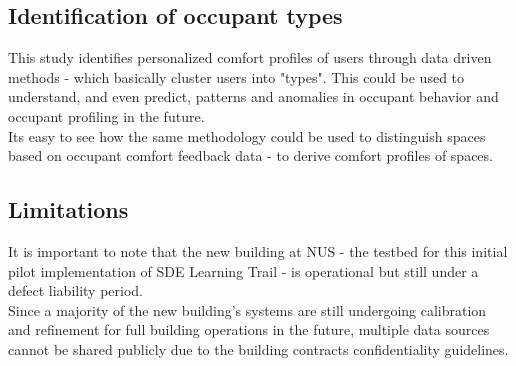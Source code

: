 \subsection{Identification of occupant types}

This study identifies personalized comfort profiles of users through data driven methods - which basically cluster users into "types". This could be used to understand, and even predict, patterns and anomalies in occupant behavior and occupant profiling in the future.\\

Its easy to see how the same methodology could be used to distinguish spaces based on occupant comfort feedback data - to derive comfort profiles of spaces.


\subsection{Limitations}
It is important to note that the new building at NUS - the testbed for this initial pilot implementation of SDE Learning Trail - is operational but still under a defect liability period.\\ 

Since a majority of the new building's systems are still undergoing calibration and refinement for full building operations in the future, multiple data sources cannot be shared publicly due to the building contracts confidentiality guidelines.  









